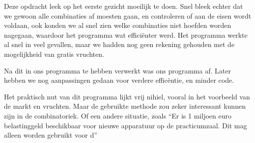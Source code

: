 Deze opdracht leek op het eerste gezicht moeilijk te doen. Snel bleek echter dat we gewoon alle combinaties af moesten gaan, en controleren of aan de eisen wordt voldaan, ook konden we al snel zien welke combinaties niet hoefden worden nagegaan, waardoor het programma wat effici\"enter werd. Het programma werkte al snel in veel gevallen, maar we hadden nog geen rekening gehouden met de mogelijkheid van gratis vruchten.

Na dit in ons programma te hebben verwerkt was ons programma af. Later hebben we nog aanpassingen gedaan voor verdere effic\"entie, en minder code.

Het praktisch nut van dit programma lijkt vrij nihiel, vooral in het voorbeeld van de markt en vruchten. Maar de gebruikte methode zou zeker interessant kunnen zijn in de combinatoriek. Of een andere situatie, zoals ``Er is 1 miljoen euro belastinggeld beschikbaar voor nieuwe apparatuur op de practicumzaal. Dit mag alleen worden gebruikt voor d''